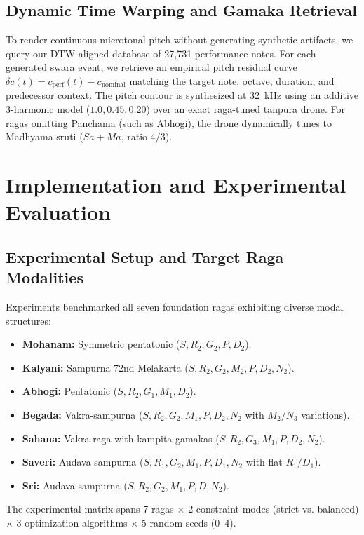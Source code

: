 \documentclass[12pt,a4paper]{report}
\begin{document}
\section{Dynamic Time Warping and Gamaka Retrieval}
To render continuous microtonal pitch without generating synthetic artifacts, we query our DTW-aligned database of 27,731 performance notes. For each generated swara event, we retrieve an empirical pitch residual curve $\delta c(t) = c_{\text{perf}}(t) - c_{\text{nominal}}$ matching the target note, octave, duration, and predecessor context. The pitch contour is synthesized at 32~kHz using an additive 3-harmonic model ($1.0, 0.45, 0.20$) over an exact raga-tuned tanpura drone. For ragas omitting Panchama (such as Abhogi), the drone dynamically tunes to Madhyama sruti ($Sa + Ma$, ratio 4/3).

\chapter{Implementation and Experimental Evaluation}

\section{Experimental Setup and Target Raga Modalities}
Experiments benchmarked all seven foundation ragas exhibiting diverse modal structures:
\begin{itemize}
    \item \textbf{Mohanam:} Symmetric pentatonic ($S, R_2, G_2, P, D_2$).
    \item \textbf{Kalyani:} Sampurna 72nd Melakarta ($S, R_2, G_2, M_2, P, D_2, N_2$).
    \item \textbf{Abhogi:} Pentatonic ($S, R_2, G_1, M_1, D_2$).
    \item \textbf{Begada:} Vakra-sampurna ($S, R_2, G_2, M_1, P, D_2, N_2$ with $M_2/N_3$ variations).
    \item \textbf{Sahana:} Vakra raga with kampita gamakas ($S, R_2, G_3, M_1, P, D_2, N_2$).
    \item \textbf{Saveri:} Audava-sampurna ($S, R_1, G_2, M_1, P, D_1, N_2$ with flat $R_1/D_1$).
    \item \textbf{Sri:} Audava-sampurna ($S, R_2, G_2, M_1, P, D, N_2$).
\end{itemize}
The experimental matrix spans 7 ragas $\times$ 2 constraint modes (strict vs. balanced) $\times$ 3 optimization algorithms $\times$ 5 random seeds (0--4).
\end{document}
